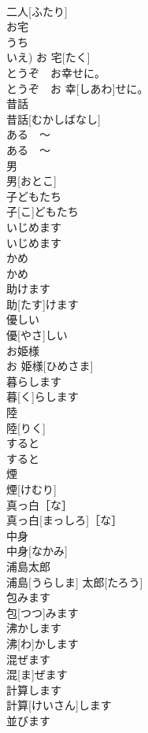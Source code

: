 \documentclass[8pt]{extreport}
\begin{document}
\begin{CJK}{UTF8}{min}
\\	二人[ふたり]	
\\	お宅	
\\	うち 
\\	いえ)	お 宅[たく]	
\\	とうぞ　お幸せに。	
\\	とうぞ　お 幸[しあわ]せに。	
\\	昔話	
\\	昔話[むかしばなし]	
\\	ある　〜	
\\	ある　〜	
\\	男	
\\	男[おとこ]	
\\	子どもたち	
\\	子[こ]どもたち	
\\	いじめます	
\\	いじめます	
\\	かめ	
\\	かめ	
\\	助けます	
\\	助[たす]けます	
\\	優しい	
\\	優[やさ]しい	
\\	お姫様	
\\	お 姫様[ひめさま]	
\\	暮らします	
\\	暮[く]らします	
\\	陸	
\\	陸[りく]	
\\	すると	
\\	すると	
\\	煙	
\\	煙[けむり]	
\\	真っ白［な］	
\\	真っ白[まっしろ]［な］	
\\	中身	
\\	中身[なかみ]	
\\	浦島太郎	
\\	浦島[うらしま] 太郎[たろう]	
\\	包みます	
\\	包[つつ]みます	
\\	沸かします	
\\	沸[わ]かします	
\\	混ぜます	
\\	混[ま]ぜます	
\\	計算します	
\\	計算[けいさん]します	
\\	並びます	

\end{CJK}
\end{document}
